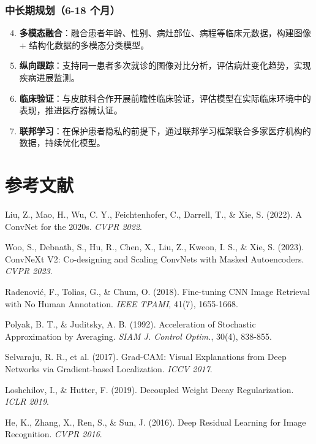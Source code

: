 \documentclass[12pt,a4paper]{report}
\begin{document}
\subsection{中长期规划（6-18 个月）}

\begin{enumerate}[leftmargin=2em, itemsep=0.3em]
    \setcounter{enumi}{3}
    \item \textbf{多模态融合}：融合患者年龄、性别、病灶部位、病程等临床元数据，构建图像 + 结构化数据的多模态分类模型。
    \item \textbf{纵向跟踪}：支持同一患者多次就诊的图像对比分析，评估病灶变化趋势，实现疾病进展监测。
    \item \textbf{临床验证}：与皮肤科合作开展前瞻性临床验证，评估模型在实际临床环境中的表现，推进医疗器械认证。
    \item \textbf{联邦学习}：在保护患者隐私的前提下，通过联邦学习框架联合多家医疗机构的数据，持续优化模型。
\end{enumerate}

\chapter*{参考文献}

\begin{enumerate}[label={[\arabic*]}, leftmargin=2em, itemsep=0.5em]
    \item Liu, Z., Mao, H., Wu, C. Y., Feichtenhofer, C., Darrell, T., \& Xie, S. (2022). A ConvNet for the 2020s. \textit{CVPR 2022}.
    
    \item Woo, S., Debnath, S., Hu, R., Chen, X., Liu, Z., Kweon, I. S., \& Xie, S. (2023). ConvNeXt V2: Co-designing and Scaling ConvNets with Masked Autoencoders. \textit{CVPR 2023}.
    
    \item Radenović, F., Tolias, G., \& Chum, O. (2018). Fine-tuning CNN Image Retrieval with No Human Annotation. \textit{IEEE TPAMI}, 41(7), 1655-1668.
    
    \item Polyak, B. T., \& Juditsky, A. B. (1992). Acceleration of Stochastic Approximation by Averaging. \textit{SIAM J. Control Optim.}, 30(4), 838-855.
    
    \item Selvaraju, R. R., et al. (2017). Grad-CAM: Visual Explanations from Deep Networks via Gradient-based Localization. \textit{ICCV 2017}.
    
    \item Loshchilov, I., \& Hutter, F. (2019). Decoupled Weight Decay Regularization. \textit{ICLR 2019}.
    
    \item He, K., Zhang, X., Ren, S., \& Sun, J. (2016). Deep Residual Learning for Image Recognition. \textit{CVPR 2016}.
\end{enumerate}
\end{document}
